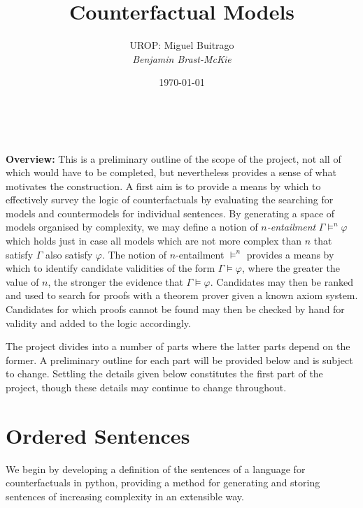 \documentclass[a4paper, 11pt]{article} %
\title{\textbf{Counterfactual Models}} %
\author{\textsc{UROP:} Miguel Buitrago\\ \em Benjamin Brast-McKie} %
\date{\today} %
\makeatletter
\renewcommand{\maketitle}{ %
\begin{flushright} %
{\LARGE\@title} %

\vspace{10pt} %

{\@author} %
\\\@date %

\vspace{30pt} %
\end{flushright}
}
\makeatother
\begin{document}
\maketitle %

\thispagestyle{empty}



\noindent
\textbf{Overview:} 
This is a preliminary outline of the scope of the project, not all of which would have to be completed, but nevertheless provides a sense of what motivates the construction.
A first aim is to provide a means by which to effectively survey the logic of counterfactuals by evaluating the searching for models and countermodels for individual sentences.
By generating a space of models organised by complexity, we may define a notion of \textit{$n$-entailment} $\Gamma \vDash^n \varphi$ which holds just in case all models which are not more complex than $n$ that satisfy $\Gamma$ also satisfy $\varphi$. 
The notion of $n$-entailment $\vDash^n$ provides a means by which to identify candidate validities of the form $\Gamma \vDash \varphi$, where the greater the value of $n$, the stronger the evidence that $\Gamma\vDash\varphi$.
Candidates may then be ranked and used to search for proofs with a theorem prover given a known axiom system.
Candidates for which proofs cannot be found may then be checked by hand for validity and added to the logic accordingly.

The project divides into a number of parts where the latter parts depend on the former.
A preliminary outline for each part will be provided below and is subject to change.
Settling the details given below constitutes the first part of the project, though these details may continue to change throughout.


\section{Ordered Sentences}

We begin by developing a definition of the sentences of a language for counterfactuals in python, providing a method for generating and storing sentences of increasing complexity in an extensible way.
\end{document}
